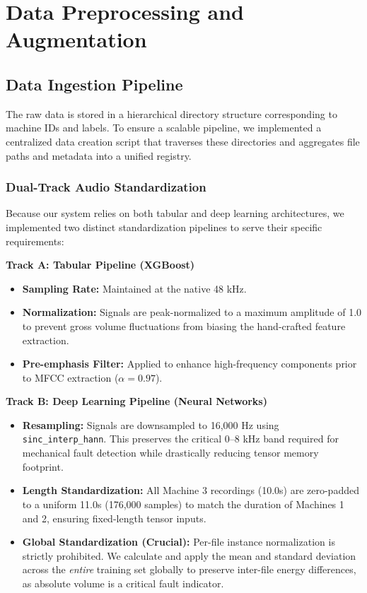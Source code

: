 \chapter{Data Preprocessing and Augmentation}

\section{Data Ingestion Pipeline}
The raw data is stored in a hierarchical directory structure corresponding to machine IDs and labels. To ensure a scalable pipeline, we implemented a centralized data creation script that traverses these directories and aggregates file paths and metadata into a unified registry.

\subsection{Dual-Track Audio Standardization}
Because our system relies on both tabular and deep learning architectures, we implemented two distinct standardization pipelines to serve their specific requirements:

\textbf{Track A: Tabular Pipeline (XGBoost)}
\begin{itemize}
    \item \textbf{Sampling Rate:} Maintained at the native 48 kHz.
    \item \textbf{Normalization:} Signals are peak-normalized to a maximum amplitude of 1.0 to prevent gross volume fluctuations from biasing the hand-crafted feature extraction.
    \item \textbf{Pre-emphasis Filter:} Applied to enhance high-frequency components prior to MFCC extraction ($\alpha = 0.97$).
\end{itemize}

\textbf{Track B: Deep Learning Pipeline (Neural Networks)}
\begin{itemize}
    \item \textbf{Resampling:} Signals are downsampled to 16,000 Hz using \texttt{sinc\_interp\_hann}. This preserves the critical 0–8 kHz band required for mechanical fault detection while drastically reducing tensor memory footprint.
    \item \textbf{Length Standardization:} All Machine 3 recordings (10.0s) are zero-padded to a uniform 11.0s (176,000 samples) to match the duration of Machines 1 and 2, ensuring fixed-length tensor inputs.
    \item \textbf{Global Standardization (Crucial):} Per-file instance normalization is strictly prohibited. We calculate and apply the mean and standard deviation across the \textit{entire} training set globally to preserve inter-file energy differences, as absolute volume is a critical fault indicator.
\end{itemize}

